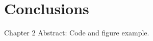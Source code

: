 \chapter{Conclusions}
\begin{chapterabstract}
    Chapter 2 Abstract: Code and figure example.
\end{chapterabstract}
    